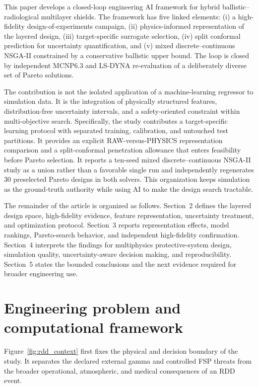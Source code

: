 \documentclass[12pt]{elsarticle}
\begin{document}
	This paper develops a closed-loop engineering AI framework for hybrid ballistic--radiological multilayer shields. The framework has five linked elements: (i) a high-fidelity design-of-experiments campaign, (ii) physics-informed representation of the layered design, (iii) target-specific surrogate selection, (iv) split conformal prediction for uncertainty quantification, and (v) mixed discrete--continuous NSGA-II constrained by a conservative ballistic upper bound. The loop is closed by independent MCNP6.3 and LS-DYNA re-evaluation of a deliberately diverse set of Pareto solutions.
	
	The contribution is not the isolated application of a machine-learning regressor to simulation data. It is the integration of physically structured features, distribution-free uncertainty intervals, and a safety-oriented constraint within multi-objective search. Specifically, the study contributes a target-specific learning protocol with separated training, calibration, and untouched test partitions. It provides an explicit RAW-versus-PHYSICS representation comparison and a split-conformal penetration allowance that enters feasibility before Pareto selection. It reports a ten-seed mixed discrete--continuous NSGA-II study as a union rather than a favorable single run and independently regenerates 30 preselected Pareto designs in both solvers. This organization keeps simulation as the ground-truth authority while using AI to make the design search tractable.

	The remainder of the article is organized as follows. Section~2 defines the layered design space, high-fidelity evidence, feature representation, uncertainty treatment, and optimization protocol. Section~3 reports representation effects, model rankings, Pareto-search behavior, and independent high-fidelity confirmation. Section~4 interprets the findings for multiphysics protective-system design, simulation quality, uncertainty-aware decision making, and reproducibility. Section~5 states the bounded conclusions and the next evidence required for broader engineering use.
	
	\section{Engineering problem and computational framework}

	Figure~\ref{fig:rdd_context} first fixes the physical and decision boundary of the study. It separates the declared external gamma and controlled FSP threats from the broader operational, atmospheric, and medical consequences of an RDD event.
	
\end{document}
